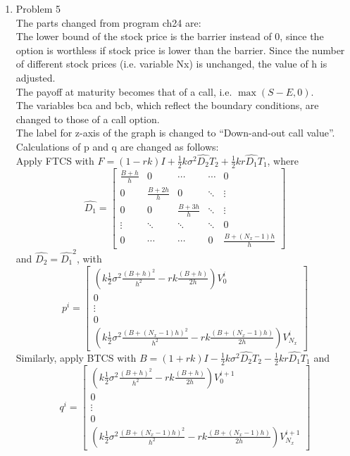 \documentclass[a4paper]{article}
\def\lb{\left(}
\def\rb{\right)}
\begin{document}
\begin{enumerate}
\pagebreak

\item Problem 5\\
The parts changed from program ch24 are:\\
The lower bound of the stock price is the barrier instead of 0, since the option is worthless if stock price is lower than the barrier. Since the number of different stock prices (i.e. variable Nx) is unchanged, the value of h is adjusted.\\
The payoff at maturity becomes that of a call, i.e. $\max(S-E,0)$.\\
The variables bca and bcb, which reflect the boundary conditions, are changed to those of a call option.\\
The label for z-axis of the graph is changed to “Down-and-out call value”.\\
Calculations of p and q are changed as follows:\\
Apply FTCS with $F=(1-rk)I+\frac{1}{2}k\sigma^2\hat{D_2}T_2+\frac{1}{2}kr\hat{D_1}T_1$, where
\[\hat{D_1}=\begin{bmatrix}  
\frac{B+h}{h} & 0 & \cdots & \cdots & 0\\
0 & \frac{B+2h}{h} & 0 & \ddots & \vdots\\
0 & 0 & \frac{B+3h}{h} & \ddots & \vdots\\
\vdots & \ddots & \ddots & \ddots & 0\\
0 & \cdots & \cdots & 0 & \frac{B+(N_x-1)h}{h}
\end{bmatrix}
\]
and $\hat{D_2}=\hat{D_1}^2$, with
\[
p^i=\begin{bmatrix}
\lb k\frac{1}{2}\sigma^2\frac{(B+h)^2}{h^2}-rk\frac{(B+h)}{2h}\rb V_0^i\\
0\\
\vdots\\
0\\
\lb k\frac{1}{2}\sigma^2\frac{(B+(N_x-1)h)^2}{h^2}-rk\frac{(B+(N_x-1)h)}{2h}\rb V_{N_x}^i
\end{bmatrix}
\]
Similarly, apply BTCS with $B=(1+rk)I-\frac{1}{2}k\sigma^2\hat{D_2}T_2-\frac{1}{2}kr\hat{D_1}T_1$ and
\[
q^i=\begin{bmatrix}
\lb k\frac{1}{2}\sigma^2\frac{(B+h)^2}{h^2}-rk\frac{(B+h)}{2h}\rb V_0^{i+1}\\
0\\
\vdots\\
0\\
\lb k\frac{1}{2}\sigma^2\frac{(B+(N_x-1)h)^2}{h^2}-rk\frac{(B+(N_x-1)h)}{2h}\rb V_{N_x}^{i+1}
\end{bmatrix}
\]
\end{enumerate}
\end{document}
